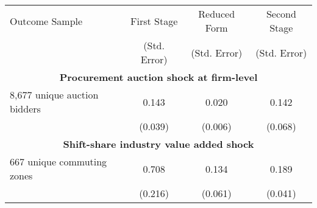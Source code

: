 \begin{tabular}{lccc}
\toprule 
\midrule 
Outcome Sample & First Stage & Reduced Form & Second Stage \\
 & (Std. Error) & (Std. Error) & (Std. Error) \\
 \cmidrule(lr){1-4} 
\multicolumn{4}{c}{\textbf{Procurement auction shock at firm-level}} \\
 \cmidrule(lr){1-4} 
8,677 unique auction bidders & 0.143 & 0.020 & 0.142 \\
 & (0.039) & (0.006) & (0.068) \\
 \cmidrule(lr){1-4} 
\multicolumn{4}{c}{\textbf{Shift-share industry value added shock}} \\
 \cmidrule(lr){1-4} 
667 unique commuting zones & 0.708 & 0.134 & 0.189 \\
 & (0.216) & (0.061) & (0.041) \\
\midrule 
\bottomrule 
\end{tabular}
